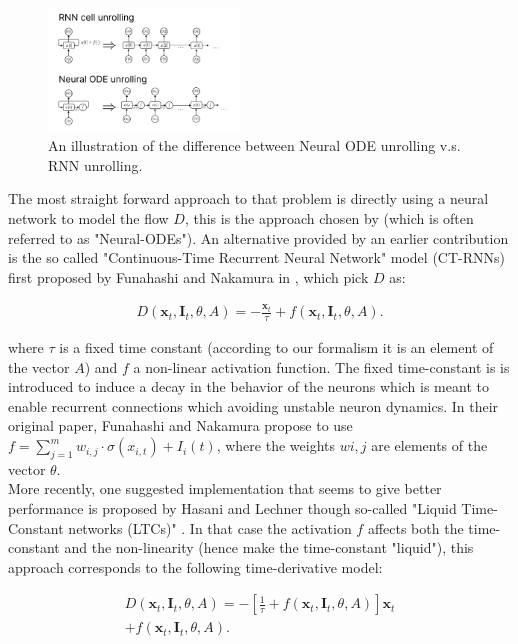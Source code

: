 \begin{figure}[h!]
    \centering
    \includegraphics[width=0.45\textwidth]{figures/unroll.pdf}
    \caption{An illustration of the difference between Neural ODE unrolling v.s. RNN unrolling.}
\end{figure}

 The most straight forward approach to that problem is directly using a neural network to model the flow $D$, this is the approach chosen by \cite{Chen2018NeuralOD} (which is often referred to as "Neural-ODEs"). An alternative provided by an earlier contribution is the so called "Continuous-Time Recurrent Neural Network" model (CT-RNNs) first proposed by Funahashi and Nakamura in \cite{Funahashi1993ApproximationOD}, which pick $D$ as: 
 
\begin{align}
    D(\bm{x}_t, \bm{I}_t, \theta, A) = -\frac{\bm{x}_t}{\tau} + f(\bm{x}_t, \bm{I}_t, \theta, A).
\end{align}

where $\tau$ is a fixed time constant (according to our formalism it is an element of the vector $A$) and $f$ a non-linear activation function. The fixed time-constant is is introduced to induce a decay in the behavior of the neurons which is meant to enable recurrent connections which avoiding unstable neuron dynamics. In their original paper, Funahashi and Nakamura propose to use $f = \sum_{j=1}^m w_{i,j} \cdot \sigma\left( x_{i,t} \right) + I_i (t)$, where the weights $w{i,j}$ are elements of the vector $\theta$. \\

More recently, one suggested implementation that seems to give better performance is proposed by Hasani and Lechner though so-called "Liquid Time-Constant networks (LTCs)" \cite{Hasani2021LiquidTN}. In that case the activation $f$ affects both the time-constant and the non-linearity (hence make the time-constant "liquid"), this approach corresponds to the following time-derivative model:

\begin{align}
    D(\bm{x}_t, \bm{I}_t, \theta, A) = - \left[ \frac{1}{\tau} + f(\bm{x}_t, \bm{I}_t, \theta, A) \right] \bm{x}_t \nonumber \\ + f(\bm{x}_t, \bm{I}_t, \theta, A).
\end{align}

